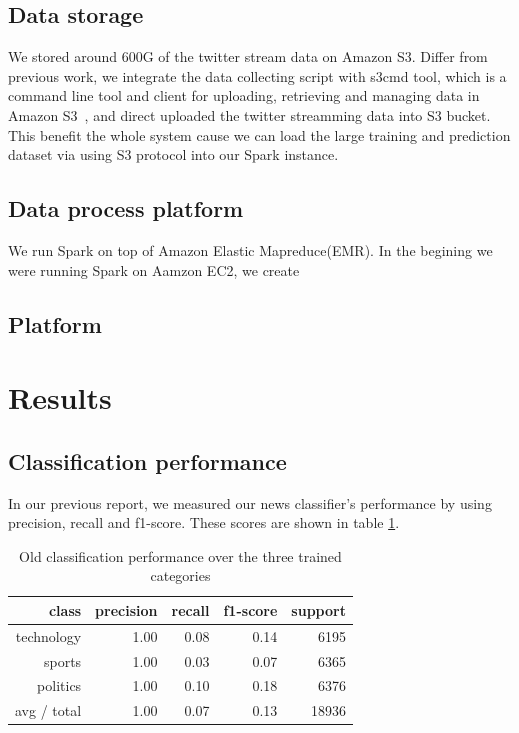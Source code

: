 \documentclass{llncs}
\begin{document}
\subsection{Data storage}
We stored around 600G of the twitter stream data on Amazon S3. Differ from previous work, we integrate the data collecting script with s3cmd tool, which is a command line tool and client for uploading, retrieving and managing data in Amazon S3~\cite{s3cmd}, and direct uploaded the twitter streamming data into S3 bucket. This benefit the whole system cause we can load the large training and prediction dataset via using S3 protocol into our Spark instance. 

\subsection{Data process platform}
We run Spark on top of Amazon Elastic Mapreduce(EMR). In the begining we were running Spark on Aamzon EC2, we create 


\subsection{Platform}

\section{Results}

\subsection{Classification performance}

In our previous report, we measured our news classifier's performance by using precision, recall and f1-score. These scores are shown in table \ref{tbl:oldclassifier}.

\begin{table}
	\begin{center}
		\begin{tabular}{|r|r|r|r|r|} \hline
			class  & precision   & recall & f1-score  & support \\ \hline
			technology    &   1.00 &     0.08  &    0.14   &   6195 \\
			sports   &    1.00   &   0.03   &   0.07   &   6365 \\
			politics   &    1.00  &    0.10   &   0.18   &   6376 \\
			avg / total  &     1.00   &   0.07  &    0.13   &  18936 \\ \hline
		\end{tabular}
	\end{center}
	\caption{Old classification performance over the three trained categories}
	\label{tbl:oldclassifier}
\end{table}
\end{document}
